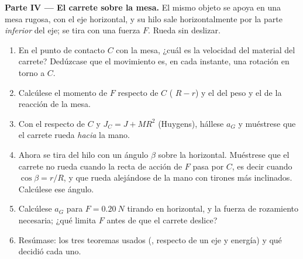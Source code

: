 \begin{problem}
\medskip
\noindent\textbf{Parte IV --- El carrete sobre la mesa.}
El mismo objeto se apoya en una mesa rugosa, con el eje horizontal, y su
hilo sale horizontalmente por la parte \emph{inferior} del eje; se tira
con una fuerza $F$. Rueda sin deslizar.
\begin{enumerate}[resume]
  \item En el punto de contacto $C$ con la mesa, ¿cuál es la velocidad del
        material del carrete? Dedúzcase que el movimiento es, en cada
        instante, una rotación en torno a $C$.
  \item Calcúlese el momento de $F$ respecto de $C$ (
        $R - r$) y el del peso y el de la reacción de la mesa.
  \item Con el  respecto de $C$ y $J_C = J +
        MR^2$ (Huygens), hállese $a_G$ y muéstrese que el carrete rueda
        \emph{hacia} la mano.
  \item Ahora se tira del hilo con un ángulo $\beta$ sobre la horizontal.
        Muéstrese que el carrete no rueda cuando la recta de acción de $F$
        pasa por $C$, es decir cuando $\cos\beta = r/R$, y que rueda
        alejándose de la mano con tirones más inclinados. Calcúlese ese
        ángulo.
  \item Calcúlese $a_G$ para $F = \qty{0.20}{N}$ tirando en horizontal, y
        la fuerza de rozamiento necesaria; ¿qué limita $F$ antes de que el
        carrete deslice?
  \item Resúmase: los tres teoremas usados (,  respecto de un eje y energía) y qué decidió cada uno.
\end{enumerate}
\end{problem}
